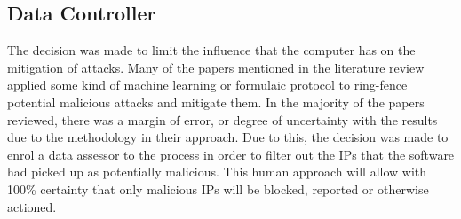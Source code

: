 \subsection*{Data Controller}
The decision was made to limit the influence that the computer has on the mitigation of attacks. Many of the papers mentioned in the literature review applied some kind of machine learning or formulaic protocol to ring-fence potential malicious attacks and mitigate them. In the majority of the papers reviewed, there was a margin of error, or degree of uncertainty with the results due to the methodology in their approach. Due to this, the decision was made to enrol a data assessor to the process in order to filter out the IPs that the software had picked up as potentially malicious. This human approach will allow with 100\% certainty that only malicious IPs will be blocked, reported or otherwise actioned. 